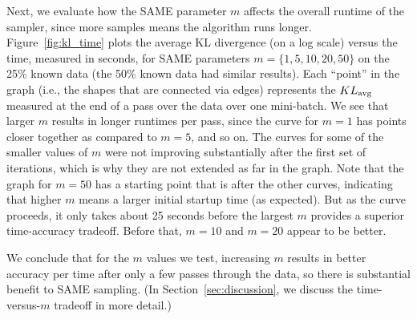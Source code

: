 \documentclass{article} %
\begin{document}
Next, we evaluate how the SAME parameter $m$ affects the overall runtime of the sampler, since more
samples means the algorithm runs longer.  Figure~\ref{fig:kl_time} plots the average KL divergence
(on a log scale) versus the time, measured in seconds, for SAME parameters $m = \{1,5,10,20,50\}$ on
the 25\% known data (the 50\% known data had similar results). Each ``point'' in the graph (i.e.,
the shapes that are connected via edges) represents the $KL_{\rm avg}$ measured at the end of a pass
over the data over one mini-batch. We see that larger $m$ results in longer runtimes per pass, since
the curve for $m=1$ has points closer together as compared to $m=5$, and so on. The curves for some
of the smaller values of $m$ were not improving substantially after the first set of iterations,
which is why they are not extended as far in the graph. Note that the graph for $m=50$ has a
starting point that is after the other curves, indicating that higher $m$ means a larger initial
startup time (as expected). But as the curve proceeds, it only takes about 25 seconds before the
largest $m$ provides a superior time-accuracy tradeoff. Before that, $m=10$ and $m=20$ appear to be
better.

We conclude that for the $m$ values we test, increasing $m$ results in better accuracy per time
after only a few passes through the data, so there is substantial benefit to SAME sampling. (In
Section~\ref{sec:discussion}, we discuss the time-versus-$m$ tradeoff in more detail.)
\end{document}

